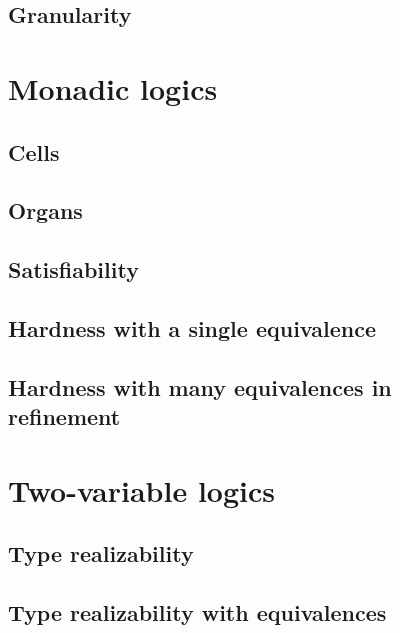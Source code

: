 \documentclass{scrbook}
\begin{document}
\section{Granularity}\label{sec:granularity}



\chapter{Monadic logics}\label{ch:monadic}


\section{Cells}


\section{Organs}


\section{Satisfiability}


\section{Hardness with a single equivalence}\label{sec:hardness-one}


\section{Hardness with many equivalences in refinement}



\chapter{Two-variable logics}\label{ch:twovar}


\section{Type realizability}


\section{Type realizability with equivalences}




\end{document}
